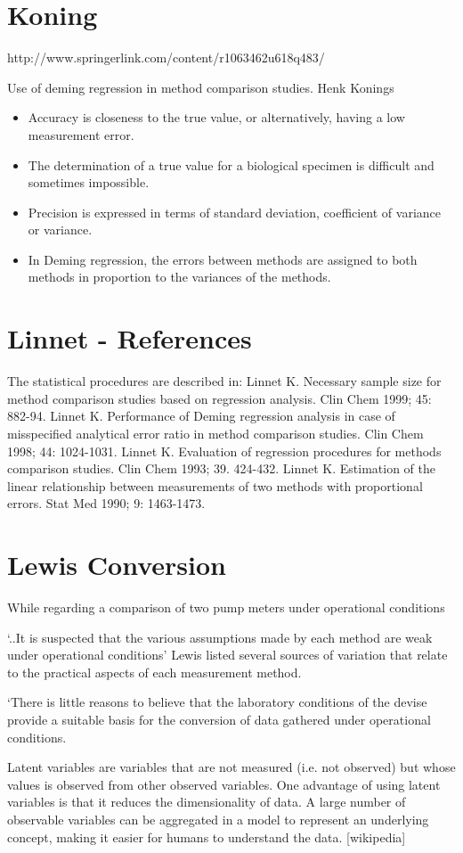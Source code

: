 \documentclass[MAIN.tex]{subfiles}
\begin{document}
\section*{Koning}
http://www.springerlink.com/content/r1063462u618q483/

Use of deming regression in method comparison studies.
Henk Konings

\begin{itemize}
\item Accuracy is closeness to the true value, or alternatively, having a low measurement error.

\item The determination of a true value for a biological specimen is difficult and sometimes impossible.

\item Precision is expressed in terms of standard deviation, coefficient of variance or variance.

\item In Deming regression, the errors between methods are assigned to both methods in proportion to the variances of the methods.
\end{itemize}


	\section{Linnet - References}
	The statistical procedures are described in:
	Linnet K. Necessary sample size for method comparison studies based on regression analysis. Clin Chem 1999; 45: 882-94.
	Linnet K. Performance of Deming regression analysis in case of misspecified analytical error ratio in method comparison studies. Clin Chem 1998; 44: 1024-1031.
	Linnet K. Evaluation of regression procedures for methods comparison studies. Clin Chem 1993; 39. 424-432.
	Linnet K. Estimation of the linear relationship between measurements of two methods with proportional errors. Stat Med 1990; 9: 1463-1473.
	
	
	\section{Lewis Conversion} 
	While regarding a comparison of two pump meters under operational conditions
	
	‘..It is suspected that the various assumptions made by each method are weak under operational conditions’
	Lewis listed several sources of variation that relate to the practical aspects of each measurement method.
	
	‘There is little reasons to believe that the laboratory conditions of the devise provide a suitable basis for the conversion of data gathered under operational conditions.
	
	
	Latent variables are variables that are not measured (i.e. not observed) but whose values is observed from other observed variables. One advantage of using latent variables is that it reduces the dimensionality of data. A large number of observable variables can be aggregated in a model to represent an underlying concept, making it easier for humans to understand the data.	[wikipedia]



\end{document}
